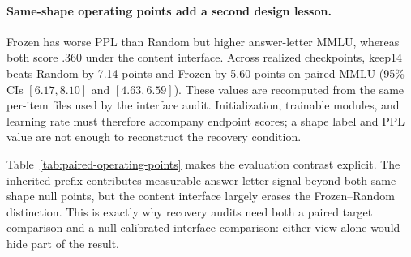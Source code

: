 \paragraph{Same-shape operating points add a second design lesson.}
Frozen has worse PPL than Random but higher answer-letter MMLU, whereas both
score .360 under the content interface. Across realized checkpoints, keep14
beats Random by 7.14 points and Frozen by 5.60 points on paired MMLU
(95\% CIs $[6.17,8.10]$ and $[4.63,6.59]$). These values are recomputed from
the same per-item files used by the interface audit. Initialization, trainable modules,
and learning rate must therefore accompany endpoint scores; a shape label and
PPL value are not enough to reconstruct the recovery condition.


Table~\ref{tab:paired-operating-points} makes the evaluation contrast explicit.
The inherited prefix contributes measurable answer-letter signal beyond both
same-shape null points, but the content interface largely erases the
Frozen--Random distinction. This is exactly why recovery audits need both a
paired target comparison and a null-calibrated interface comparison: either
view alone would hide part of the result.
